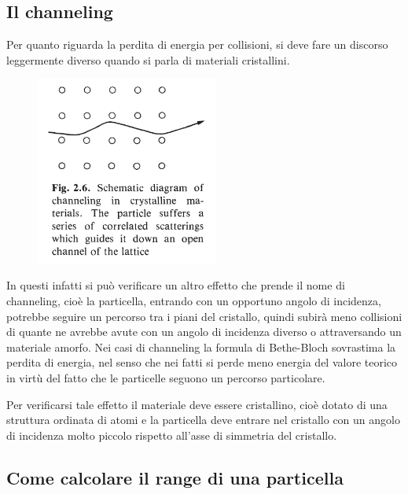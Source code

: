 \subsection{Il channeling}

Per quanto riguarda la perdita di energia per collisioni, si deve fare un discorso leggermente diverso quando si parla di materiali cristallini.

\begin{minipage}{0.395\textwidth}
    \begin{figure}[H]
        \centering
        \includegraphics[width=6cm]{immagini/channeling.png}
    \end{figure}
\end{minipage}
\begin{minipage}{0.6\textwidth}
    \vspace{0.4cm}In questi infatti si può verificare un altro effetto che prende il nome di channeling, cioè la particella, entrando con un opportuno angolo di incidenza, potrebbe seguire un percorso tra i piani del cristallo, quindi subirà meno collisioni di quante ne avrebbe avute con un angolo di incidenza diverso o attraversando un materiale amorfo. Nei casi di channeling la formula di Bethe-Bloch sovrastima la perdita di energia, nel senso che nei fatti si perde meno energia del valore teorico in virtù del fatto che le particelle seguono un percorso particolare.
\end{minipage}

\vspace{0.2cm}Per verificarsi tale effetto il materiale deve essere cristallino, cioè dotato di una struttura ordinata di atomi e la particella deve entrare nel cristallo con un angolo di incidenza molto piccolo rispetto all'asse di simmetria del cristallo.

\subsection{Come calcolare il range di una particella}

